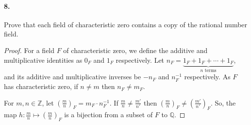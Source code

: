 \documentclass{article}
\begin{document}
\paragraph{8.} Prove that each field of characteristic zero contains a copy of
the rational number field.

\begin{proof}
  For a field $F$ of characteristic zero, we define the additive and
  multiplicative identities as $0_F$ and $1_F$ respectively. Let $n_F =
  \underbrace{1_F + 1_F + \cdots + 1_F}_{n\text{ terms}}$, and its additive and
  multiplicative inverses be $-n_F$ and $n_F^{-1}$ respectively. As $F$ has
  characteristic zero, if $n \neq m$ then $n_F \neq m_F$.

  For $m, n \in \mathbb{Z}$, let $\left(\frac{m}{n}\right)_F = m_F \cdot
  n_F^{-1}$. If $\frac{m}{n} \neq \frac{m'}{n'}$ then
  $\left(\frac{m}{n}\right)_F \neq \left(\frac{m'}{n'}\right)_F$. So, the map
  $h: \frac{m}{n} \mapsto \left(\frac{m}{n}\right)_F$ is a bijection from a
  subset of $F$ to $\mathbb{Q}$.
\end{proof}
\end{document}
